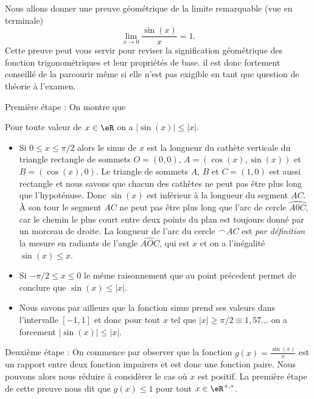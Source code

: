 Nous allons donner une preuve géométrique de la limite remarquable (vue en terminale) 
\begin{equation}\label{sinsurx}
  \lim_{x\to 0} \frac{\sin(x)}{x} = 1.
\end{equation}
Cette preuve peut vous servir pour reviser la signification géométrique des fonction trigonométriques et leur propriétés de base. il est donc fortement conseillé de la parcourir m\^eme si elle n'est pas exigible en tant que question de théorie à l'examen. 
\begin{description}
  \item{Première étape : } On montre que 
    \begin{lemma}
      Pour toute valeur de $x\in \eR$ on a $|\sin(x)|\leq |x|$. 
    \end{lemma}
    \begin{itemize}
    \item Si $0\leq x\leq \pi/2$ alors le sinus de $x$ est la longueur du cathète verticale du triangle rectangle de sommets $O = (0,0)$, $A = (\cos(x), \sin(x))$ et $B = (\cos(x), 0)$. Le triangle de sommets $A$, $B$ et $C = (1, 0)$ est aussi rectangle et nous savons que chacun des cathètes ne peut pas \^etre plus long que l'hypoténuse. Donc $\sin(x)$ est inférieur à la longueur du segment $AC$. À son tour le segment $AC$ ne peut pas \^etre plus long que l'arc de cercle $\wideparen{A0C}$, car le chemin le plus court entre deux points du plan est toujours donné par un morceau de droite. La longueur de l'arc du cercle $\frown{AC}$ est \emph{par définition} la mesure en radiants de l'angle $\widehat{AOC}$, qui est $x$ et on a l'inégalité $\sin(x)\leq x$. 
    \item Si $-\pi/2\leq x\leq 0$ le m\^eme raisonnement que au point précedent permet de conclure que $\sin(x)\leq |x|$.
    \item Nous savons par ailleurs que la fonction sinus prend ses valeurs dans l'intervalle $[-1,1]$ et donc pour tout $x$ tel que $|x|\geq \pi/2 \equiv 1,57\ldots$ on a forcement $|\sin(x)|\leq |x|$.  
    \end{itemize}
  \item{Deuxième étape :} On commence par observer que la fonction $g(x)=\frac{\sin(x)}{x}$ est un rapport entre deux fonction impairers et est donc une fonction paire. Nous pouvons alors nous réduire à considèrer le cas où $x$ est positif. La première étape de cette preuve nous dit que $g(x)\leq 1$ pour tout $x\in\eR^{+,*}$. 


\end{description}
